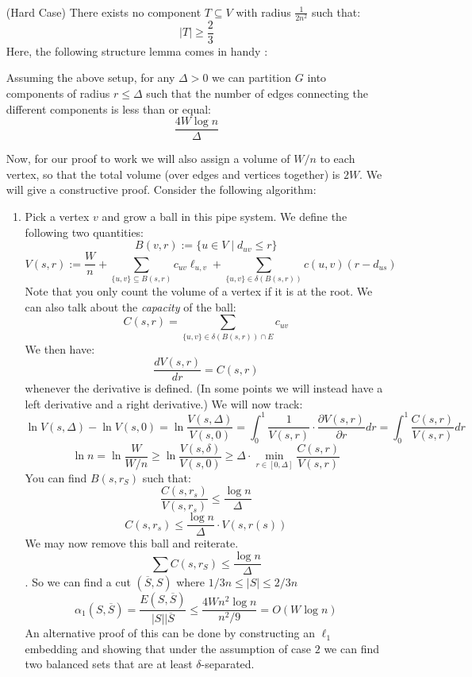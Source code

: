 \documentclass[11pt]{article}
\begin{document}
\begin{itemize}
\begin{enumerate}
\begin{align*}
        \end{align*}
    \end{enumerate}
    \item[(Hard Case)]There exists no component $T\subseteq V$ with radius $\frac{1}{2n^2}$ such that:
    \[
        |T| \geq \frac{2}{3}
    \]
    Here, the following structure lemma comes in handy :
    \begin{lemma}
    Assuming the above setup, for any $\Delta >0$ we can partition $G$ into components of radius $r \leq \Delta$ such that the number of edges connecting the different components is less than or equal:
    \[
        \frac{4W\log n}{\Delta}
    \]
    \end{lemma}
    Now, for our proof to work we will also assign a volume of $W / n$ to each vertex, so that the total volume (over edges and vertices together) is $2W$.
    We will give a constructive proof. Consider the following algorithm:
    \begin{enumerate}
        \item Pick a vertex $v$ and grow a ball in this pipe system. We define the following two quantities:
        \[
            B(v,r) := \{ u \in V\mid d_{uv}\leq r\}
        \]
        \[
            V(s,r):= \frac{W}{n}+ \sum_{\{u,v\} \subseteq B(s,r)} c_{uv}\ell_{u,v} + \sum_{\{u,v\} \in \delta(B(s,r))}c(u,v)(r- d_{us})
        \]
        Note that you only count the volume of a vertex if it is at the root. We can also talk about the \emph{capacity} of the ball:
        \[
            C(s,r) = \sum_{\{u,v\}\in \delta(B(s,r))\cap E} c_{uv}
        \]
        We then have:
        \[
            \frac{dV(s,r)}{dr} = C(s,r)
        \]
        whenever the derivative is defined. (In some points we will instead have a left derivative and a right derivative.)
        We will now track:
        \[
            \ln V(s, \Delta) - \ln V(s,0) = \ln \frac{V(s, \Delta)}{V(s,0)} = \int_{0}^1 \frac{1}{V(s,r)}\cdot \frac{\partial V(s,r)}{\partial r} dr = \int_{0}^{1} \frac{C(s,r)}{V(s,r)} dr
        \]
        \[
            \ln n = \ln \frac{W}{W/n} \geq \ln \frac{V(s,\delta)}{V(s,0)}\geq \Delta \cdot \underset{r \in [0,\Delta]}{\min}\frac{C(s,r)}{V(s,r)}
        \]
        You can find $B(s,r_S)$ such that:
        \[
            \frac{C(s,r_s)}{V(s,r_s)}\leq \frac{\log n}{\Delta}
        \]
        \[
        C(s,r_s) \leq \frac{\log n}{\Delta}\cdot V(s,r(s))
        \]
        We may now remove this ball and reiterate.
        \[
            \sum C(s, r_S) \leq \frac{\log n}{\Delta}
        \].
        So we can find a cut $(\overline{S},S)$ where $1/3n \leq |S| \leq 2/3n$
        \[
            \alpha_1(S, \overline{S}) = \frac{E(S, \overline{S})}{|S||\overline{S}} \leq \frac{4Wn^2 \log n}{n^2/9} = O(W \log n)
        \]
        An alternative proof of this can be done by constructing an $\ell_1$ embedding and showing that under the assumption of case $2$ we can find two balanced sets that are at least $\delta$-separated.
    \end{enumerate}
\end{itemize}
\end{document}
